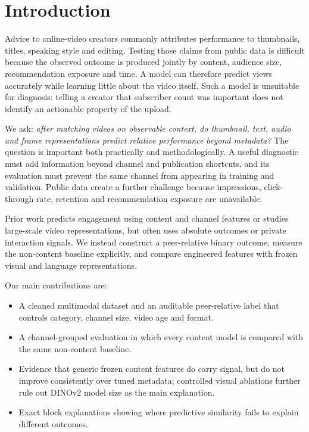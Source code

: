 \documentclass[letterpaper]{article}
\begin{document}
\section{Introduction}

Advice to online-video creators commonly attributes performance to thumbnails,
titles, speaking style and editing. Testing those claims from public data is
difficult because the observed outcome is produced jointly by content,
audience size, recommendation exposure and time. A model can therefore predict
views accurately while learning little about the video itself. Such a model is
unsuitable for diagnosis: telling a creator that subscriber count was important
does not identify an actionable property of the upload.

We ask: \emph{after matching videos on observable context, do thumbnail, text,
audio and frame representations predict relative performance beyond metadata?}
The question is important both practically and methodologically. A useful
diagnostic must add information beyond channel and publication shortcuts, and
its evaluation must prevent the same channel from appearing in training and
validation. Public data create a further challenge because impressions,
click-through rate, retention and recommendation exposure are unavailable.

Prior work predicts engagement using content and channel features or studies
large-scale video representations, but often uses absolute outcomes or private
interaction signals. We instead construct a peer-relative binary outcome,
measure the non-content baseline explicitly, and compare engineered features
with frozen visual and language representations.

Our main contributions are:
\begin{itemize}
\item A cleaned multimodal dataset and an auditable peer-relative label that
      controls category, channel size, video age and format.
\item A channel-grouped evaluation in which every content model is compared
      with the same non-content baseline.
\item Evidence that generic frozen content features do carry signal, but do not
      improve consistently over tuned metadata; controlled visual ablations
      further rule out DINOv2 model size as the main explanation.
\item Exact block explanations showing where predictive similarity fails to
      explain different outcomes.
\end{itemize}
\end{document}
